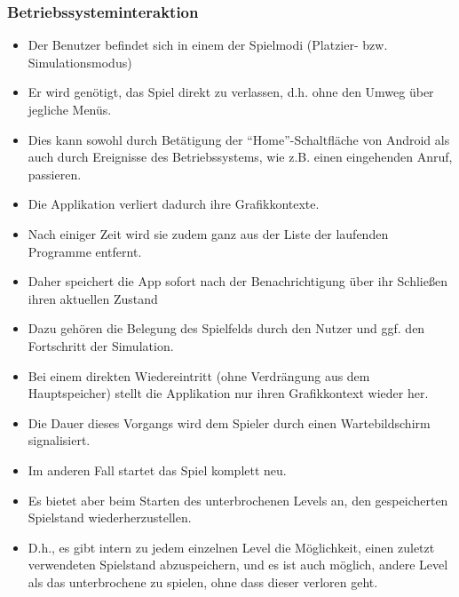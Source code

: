 \subsubsection{Betriebssysteminteraktion}
\begin{itemize}
\item Der Benutzer befindet sich in einem der Spielmodi (Platzier- bzw. 
Simulationsmodus)
\item Er wird genötigt, das Spiel direkt zu verlassen, d.h. ohne den Umweg über jegliche Menüs.
\item Dies kann sowohl durch Betätigung der ``Home''-Schaltfläche von Android als auch durch
Ereignisse des Betriebssystems, wie z.B. einen eingehenden Anruf, passieren.
\item Die Applikation verliert dadurch ihre Grafikkontexte.
\item Nach einiger Zeit wird sie zudem ganz aus der Liste der laufenden Programme entfernt.
\item Daher speichert die App sofort nach der Benachrichtigung über ihr Schließen ihren aktuellen Zustand
\item Dazu gehören die Belegung des Spielfelds durch den Nutzer und ggf. den Fortschritt der Simulation.
\item Bei einem direkten Wiedereintritt (ohne Verdrängung aus dem Hauptspeicher) stellt die Applikation nur ihren Grafikkontext wieder her.
\item Die Dauer dieses Vorgangs wird dem Spieler durch einen Wartebildschirm signalisiert.
\item Im anderen Fall startet das Spiel komplett neu.
\item Es bietet aber beim Starten des unterbrochenen Levels an, den gespeicherten Spielstand wiederherzustellen. 
\item D.h., es gibt intern zu jedem einzelnen Level die Möglichkeit,
einen zuletzt verwendeten Spielstand abzuspeichern, und es ist auch möglich, andere Level als das
unterbrochene zu spielen, ohne dass dieser verloren geht.
\end{itemize}
